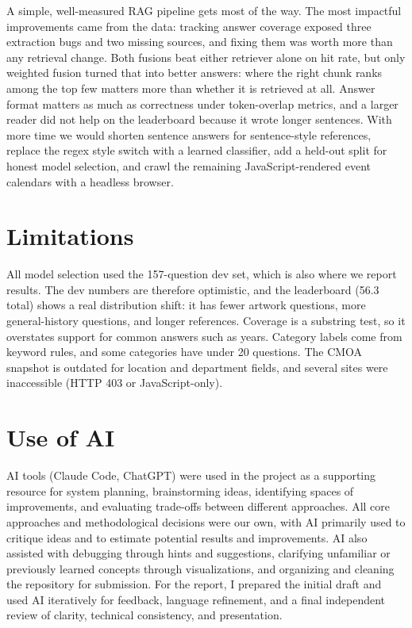 \documentclass[11pt]{article}
\begin{document}
A simple, well-measured RAG pipeline gets most of the way. The most impactful improvements came from the data: tracking answer coverage exposed three extraction bugs and two missing sources, and fixing them was worth more than any retrieval change. Both fusions beat either retriever alone on hit rate, but only weighted fusion turned that into better answers: where the right chunk ranks among the top few matters more than whether it is retrieved at all. Answer format matters as much as correctness under token-overlap metrics, and a larger reader did not help on the leaderboard because it wrote longer sentences. With more time we would shorten sentence answers for sentence-style references, replace the regex style switch with a learned classifier, add a held-out split for honest model selection, and crawl the remaining JavaScript-rendered event calendars with a headless browser.

\section*{Limitations}

All model selection used the 157-question dev set, which is also where we report results. The dev numbers are therefore optimistic, and the leaderboard (56.3 total) shows a real distribution shift: it has fewer artwork questions, more general-history questions, and longer references. Coverage is a substring test, so it overstates support for common answers such as years. Category labels come from keyword rules, and some categories have under 20 questions. The CMOA snapshot is outdated for location and department fields, and several sites were inaccessible (HTTP 403 or JavaScript-only).

\section*{Use of AI}

AI tools (Claude Code, ChatGPT) were used in the project as a supporting
resource for system planning, brainstorming ideas,
identifying spaces of improvements, and evaluating
trade-offs between different approaches. All core
approaches and methodological decisions were our
own, with AI primarily used to critique ideas and
to estimate potential results and improvements. AI
also assisted with debugging through hints and
suggestions, clarifying unfamiliar or previously
learned concepts through visualizations, and organizing and cleaning the repository for submission.
For the report, I prepared the initial draft and used
AI iteratively for feedback, language refinement,
and a final independent review of clarity, technical
consistency, and presentation.


\end{document}
